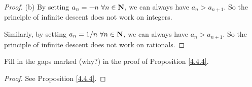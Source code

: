 \begin{proof}{(b)}
    By setting \(a_n = -n \ \forall n \in \mathbf{N}\), we can always have \(a_n > a_{n + 1}\).
    So the principle of infinite descent does not work on integers.

    Similarly, by setting \(a_n = 1 / n \ \forall n \in \N\), we can always have \(a_n > a_{n + 1}\).
    So the principle of infinite descent does not work on rationals.
\end{proof}

\begin{exercise}\label{ex 4.4.3}
    Fill in the gaps marked (why?) in the proof of Proposition \ref{4.4.4}.
\end{exercise}

\begin{proof}
    See Proposition \ref{4.4.4}.
\end{proof}
